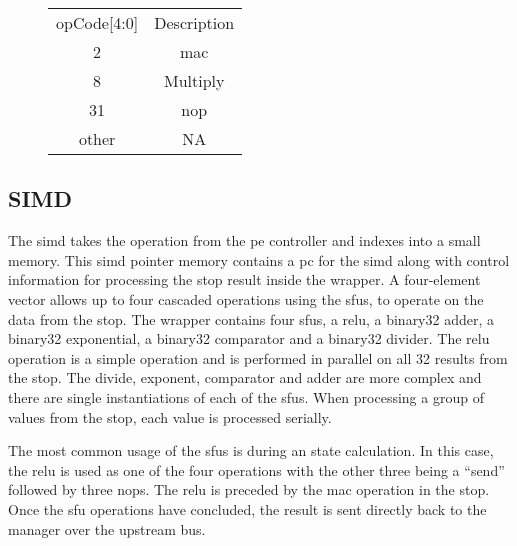 \begin{figure}[h]
\begin{minipage}{1\textwidth}
\begin{minipage}{1\textwidth}
\begin{minipage}[t]{1\textwidth}
\begin{minipage}[t]{0.25\textwidth}
\begin{adjustbox}{width=1\textwidth}
\begin{tabular}{ |c|c|  }
                \hline
                \rowcolor{gray!50}
                \multicolumn{2}{|c|}{Function} \\
                \hline
                \rowcolor{gray!25}
                opCode[4:0] & Description  \\
                \hline
                2      & \ac{mac} \\
                8      & Multiply \\
                31     & \ac{nop} \\
                other  & NA       \\
                \hline
              \end{tabular}
          \end{adjustbox}
        \end{minipage}
      \end{minipage}
    \end{minipage}
    \label{tab:stOp op fields}
  \end{minipage}
\end{figure}


\subsection{SIMD}
\label{sec:simd}

The \ac{simd} takes the operation from the \ac{pe} controller and indexes into a small memory. This \ac{simd} pointer memory contains a \ac{pc} for the \ac{simd} along with control information for processing the \ac{stop} result inside the wrapper.
A four-element vector allows up to four cascaded operations using the \acp{sfu}, to operate on the data from the \ac{stop}.
The wrapper contains four \acp{sfu}, a \ac{relu}, a \ac{binary32} adder, a \ac{binary32} exponential, a \ac{binary32} comparator and a \ac{binary32} divider.
The \ac{relu} operation is a simple operation and is performed in parallel on all 32 results from the \ac{stop}.
The divide, exponent, comparator and adder are more complex and there are single instantiations of each of the \acp{sfu}.
When processing a group of values from the \ac{stop}, each value is processed serially.

The most common usage of the \acp{sfu} is during \ac{an} state calculation. In this case, the \ac{relu} is used as one of the four operations with the other three being a ``send'' followed by three \acp{nop}.
The \ac{relu} is preceded by the \ac{mac} operation in the \ac{stop}.
Once the \ac{sfu} operations have concluded, the result is sent directly back to the manager over the upstream bus.

